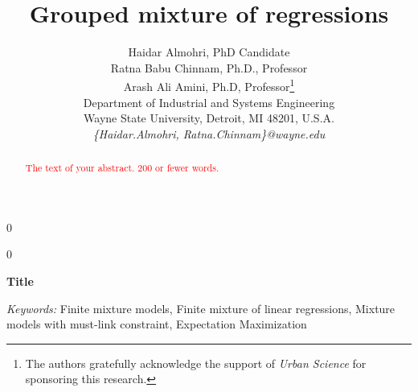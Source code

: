 \documentclass[12pt]{article}
\newcommand{\blind}{0}
\begin{document}
%


\blind
{
\title{\bf  Grouped mixture of regressions}
\author{Haidar Almohri, PhD Candidate \\
	Ratna Babu Chinnam, Ph.D., Professor\\ Arash Ali Amini, Ph.D, Professor\thanks{	
 	The authors gratefully acknowledge the support of \textit{Urban Science} for sponsoring this research.}\hspace{.2cm}\\
 Department of Industrial and Systems Engineering\\
 Wayne State University, Detroit, MI 48201, U.S.A.\\
 {\normalsize \textit{\{Haidar.Almohri, Ratna.Chinnam\}@wayne.edu}}}
\maketitle
} \fi

\blind
{
\bigskip
\bigskip
\bigskip
\begin{center}
 {\LARGE\bf Title}
\end{center}
\medskip
} \fi

\bigskip
\begin{abstract}
\textcolor{red}{The text of your abstract.  200 or fewer words.}\\

\end{abstract}

\noindent%
{\it Keywords:} Finite mixture models, Finite mixture  of linear regressions, Mixture models with must-link constraint, Expectation Maximization
\vfill

\newpage
{} %
\end{document}
